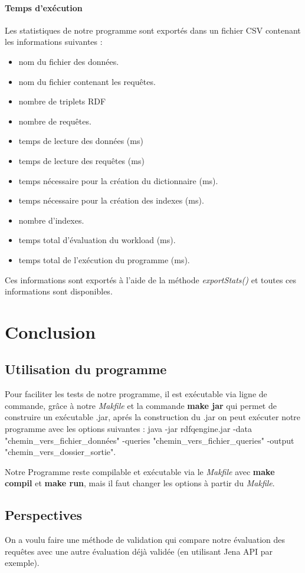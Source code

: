 \documentclass[12pt,titlepage]{article}
\begin{document}
\paragraph{Temps d'exécution}
Les statistiques de notre programme sont exportés dans un fichier CSV contenant les informations suivantes : 

\begin{itemize}
  \item nom du fichier des données.
  \item nom du fichier contenant les requêtes.
  \item nombre de triplets RDF
  \item nombre de requêtes.
  \item temps de lecture des données (ms) 
  \item temps de lecture des requêtes (ms)
  \item temps nécessaire pour la création du dictionnaire (ms).
  \item temps nécessaire pour la création des indexes (ms). 
  \item nombre d'indexes.
  \item temps total d'évaluation du workload (ms). 
  \item temps total de l'exécution du programme (ms).

\end{itemize}

Ces informations sont exportés à l'aide de la méthode \textit{exportStats()} et toutes ces informations sont disponibles.

\section{Conclusion}

\subsection{Utilisation du programme}
Pour faciliter les tests de notre programme, il est exécutable via ligne de commande, grâce à notre \textit{Makfile} et la commande \textbf{make jar} qui permet de construire un exécutable .jar, aprés la construction du .jar on peut exécuter notre programme avec les options suivantes : 
java -jar rdfqengine.jar -data "chemin_vers_fichier_données" -queries "chemin_vers_fichier_queries" -output "chemin_vers_dossier_sortie".

Notre Programme reste compilable et exécutable via le \textit{Makfile} avec \textbf{make compil} et \textbf{make run}, mais il faut changer les options à partir du \textit{Makfile}.


\subsection{Perspectives}
On a voulu faire une méthode de validation qui compare notre évaluation des requêtes avec une autre évaluation déjà validée (en utilisant Jena API par exemple).
\end{document}
